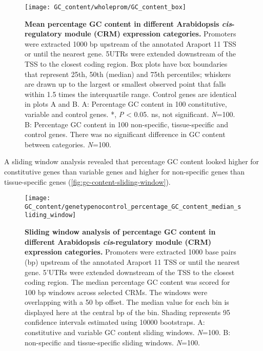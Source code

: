 \documentclass[../main.tex]{subfiles}
\begin{document}
\begin{figure}[hbt!]
	\begin{center}
		\capstart
		\texttt{[image: GC\_content/wholeprom/GC\_content\_box]}
		\caption{
			\textbf{Mean percentage GC content in different Arabidopsis \textit{cis}\hyp{}regulatory module (CRM) expression categories.}
			Promoters were extracted 1000 bp upstream of the annotated Araport 11 \autocite{chengAraport11CompleteReannotation2017} TSS or until the nearest gene.
			5UTRs were extended downstream of the TSS to the closest coding region.  Box plots have box boundaries that represent 25th, 50th (median) and 75th percentiles; whiskers are drawn up to the largest or smallest observed point that falls within 1.5 times the interquartile range.
			Control genes are identical in plots A and B.
			A: Percentage GC content in 100 constitutive, variable and control genes. *, \textit{P} \textless{} 0.05. ns, not significant. \textit{N}=100.
			B: Percentage GC content in 100 non\hyp{}specific, tissue\hyp{}specific and control genes. There was no significant difference in GC content between categories. \textit{N}=100.
			\label{fig:gc-content-wholeprom}
		}
	\end{center}
\end{figure}

A sliding window analysis revealed that percentage GC content looked higher for constitutive genes than variable genes and higher for non\hyp{}specific genes than tissue\hyp{}specific genes (\autoref{fig:gc-content-sliding-window}).

\begin{figure}[hbt!]
	\begin{center}
		\capstart
		\texttt{[image: GC\_content/genetypenocontrol\_percentage\_GC\_content\_median\_sliding\_window]}
		\caption{
			\textbf{Sliding window analysis of percentage GC content in different Arabidopsis \textit{cis}\hyp{}regulatory module (CRM) expression categories.}
			Promoters were extracted 1000 base pairs (bp) upstream of the annotated Araport 11 \autocite{chengAraport11CompleteReannotation2017} TSS or until the nearest gene.
			5'UTRs were extended downstream of the TSS to the closest coding region.
			The median percentage GC content was scored for 100 bp windows across selected CRMs.
			The windows were overlapping with a 50 bp offset.
			The median value for each bin is displayed here at the central bp of the bin.
			Shading represents 95 confidence intervals estimated using 10000 bootstraps.
			A: constitutive and variable GC content sliding windows. \textit{N}=100.
			B: non\hyp{}specific and tissue\hyp{}specific sliding windows. \textit{N}=100.
			\label{fig:gc-content-sliding-window}
		}
	\end{center}
\end{figure}
\end{document}
